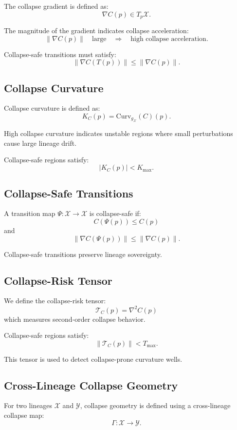 The collapse gradient is defined as:
\[
\nabla C(p) \in T_p \mathcal{X}.
\]

The magnitude of the gradient indicates collapse acceleration:
\[
\| \nabla C(p) \| \quad \text{large} \quad \Rightarrow \quad \text{high collapse acceleration}.
\]

Collapse-safe transitions must satisfy:
\[
\| \nabla C(T(p)) \| \le \| \nabla C(p) \|.
\]

\subsection{Collapse Curvature}

Collapse curvature is defined as:
\[
K_C(p) = \text{Curv}_{g_{\mathcal{X}}}(C)(p).
\]

High collapse curvature indicates unstable regions where small perturbations
cause large lineage drift.

Collapse-safe regions satisfy:
\[
|K_C(p)| < K_{\max}.
\]

\subsection{Collapse-Safe Transitions}

A transition map $\Psi : \mathcal{X} \rightarrow \mathcal{X}$ is collapse-safe if:
\[
C(\Psi(p)) \le C(p)
\]
and
\[
\| \nabla C(\Psi(p)) \| \le \| \nabla C(p) \|.
\]

Collapse-safe transitions preserve lineage sovereignty.

\subsection{Collapse-Risk Tensor}

We define the collapse-risk tensor:
\[
\mathcal{T}_C(p) = \nabla^2 C(p)
\]
which measures second-order collapse behavior.

Collapse-safe regions satisfy:
\[
\| \mathcal{T}_C(p) \| < T_{\max}.
\]

This tensor is used to detect collapse-prone curvature wells.

\subsection{Cross-Lineage Collapse Geometry}

For two lineages $\mathcal{X}$ and $\mathcal{Y}$, collapse geometry is defined
using a cross-lineage collapse map:
\[
\Gamma : \mathcal{X} \rightarrow \mathcal{Y}.
\]

